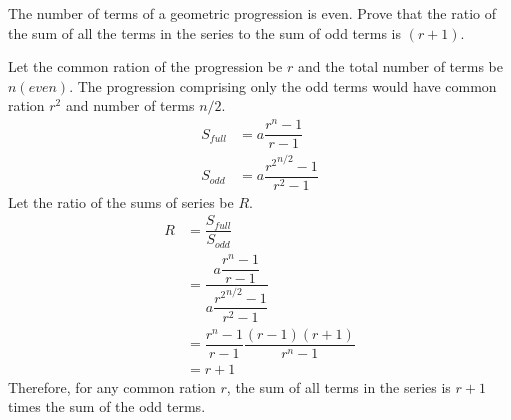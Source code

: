 
%
%
%
%
% 
% 

\question[4] The number of terms of a geometric progression is even. Prove that the ratio of the sum of all the terms in the series to the sum of odd terms is $(r+1)$.


\ifprintanswers
\fi 

\begin{solution}[\halfpage]
  Let the common ration of the progression be $r$ and the total number of terms be $n(even)$. The progression comprising only the odd terms would have common ration $r^2$ and number of terms $n/2$. \\
  \begin{align}
    S_{full} &= a\dfrac{r^n-1}{r-1} \\
    S_{odd}  &= a\dfrac{{r^2}^{n/2}-1}{r^2-1}
  \end{align}
  Let the ratio of the sums of series be $R$.
  \begin{align}
    R &= \dfrac{S_{full}}{S_{odd}} \\
      &= \dfrac{a\dfrac{r^n-1}{r-1}}{a\dfrac{{r^2}^{n/2}-1}{r^2-1}} \\
      &= \dfrac{r^n-1}{r-1}\dfrac{(r-1)(r+1)}{r^n-1} \\
      &= r + 1
  \end{align}
  Therefore, for any common ration $r$, the sum of all terms in the series is $r+1$ times the sum of the odd terms.
\end{solution}

